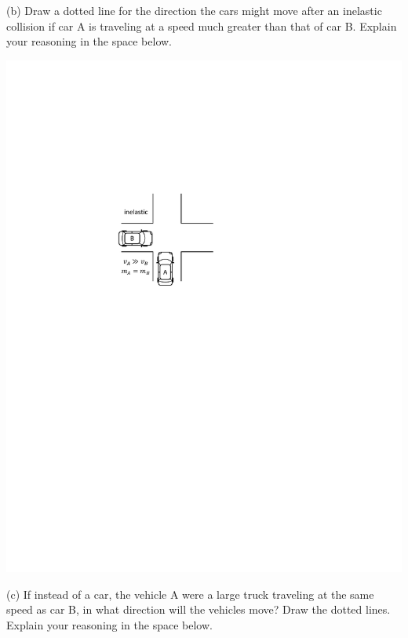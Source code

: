 \pagebreak[3]
(b) Draw a dotted line for the direction the cars might move after an inelastic collision if car A is traveling
at a speed much greater than that of car B. Explain your reasoning in the space
below. 

\hspace{0.3in}
\includegraphics{twod_collisions/two_cars_unequal_speeds.pdf}

(c) If instead of a car, the vehicle A were a large truck traveling at the same
speed as car B, in what direction will the vehicles move? Draw the dotted lines.
Explain your reasoning in the space below.

